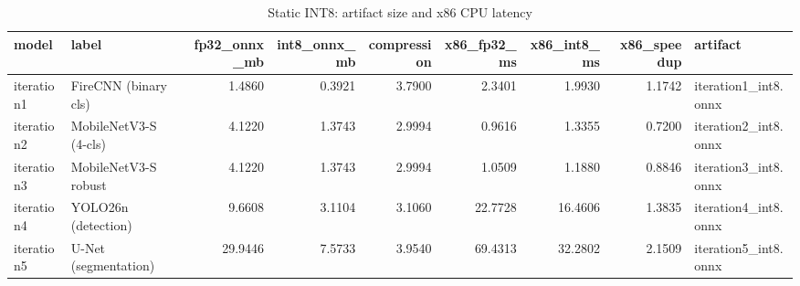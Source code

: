 \begin{table}
\caption{Static INT8: artifact size and x86 CPU latency}
\begin{tabular}{llrrrrrrl}
\toprule
model & label & fp32\_onnx\_mb & int8\_onnx\_mb & compression & x86\_fp32\_ms & x86\_int8\_ms & x86\_speedup & artifact \\
\midrule
iteration1 & FireCNN (binary cls) & 1.4860 & 0.3921 & 3.7900 & 2.3401 & 1.9930 & 1.1742 & iteration1\_int8.onnx \\
iteration2 & MobileNetV3-S (4-cls) & 4.1220 & 1.3743 & 2.9994 & 0.9616 & 1.3355 & 0.7200 & iteration2\_int8.onnx \\
iteration3 & MobileNetV3-S robust & 4.1220 & 1.3743 & 2.9994 & 1.0509 & 1.1880 & 0.8846 & iteration3\_int8.onnx \\
iteration4 & YOLO26n (detection) & 9.6608 & 3.1104 & 3.1060 & 22.7728 & 16.4606 & 1.3835 & iteration4\_int8.onnx \\
iteration5 & U-Net (segmentation) & 29.9446 & 7.5733 & 3.9540 & 69.4313 & 32.2802 & 2.1509 & iteration5\_int8.onnx \\
\bottomrule
\end{tabular}
\end{table}
